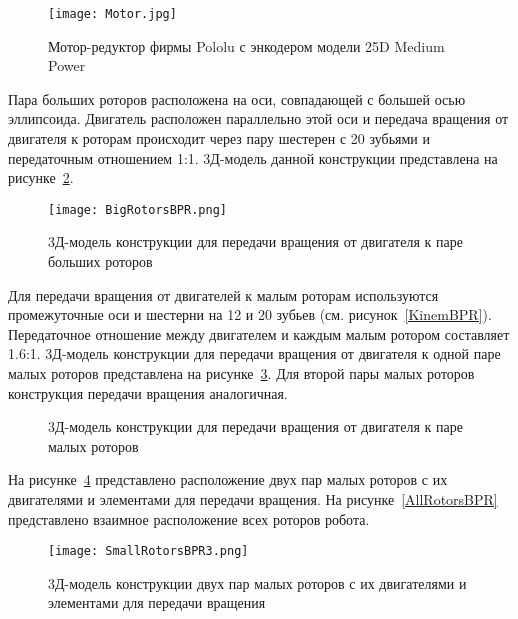 \begin{figure}[h]
	\centering
	\texttt{[image: Motor.jpg]}%
	\caption{Мотор-редуктор фирмы Pololu с энкодером модели 25D Medium Power}
	\label{MotorBPR}
\end{figure}





Пара больших роторов расположена на оси, совпадающей с большей осью эллипсоида. Двигатель расположен параллельно этой оси и передача вращения от двигателя к роторам происходит через пару шестерен с 20 зубьями и передаточным отношением 1:1. 3Д-модель данной конструкции представлена на рисунке~\ref{BigRotorsBPR}.

\begin{figure}[h]
	\centering
	\texttt{[image: BigRotorsBPR.png]}%
	\caption{3Д-модель конструкции для передачи вращения от двигателя к паре больших роторов}
	\label{BigRotorsBPR}
\end{figure}

Для передачи вращения от двигателей к малым роторам используются промежуточные оси и шестерни на 12 и 20 зубьев (см. рисунок~\ref{KinemBPR}). Передаточное отношение между двигателем и каждым малым ротором составляет 1.6:1. 3Д-модель конструкции для передачи вращения от двигателя к одной паре малых роторов представлена на рисунке~\ref{SmallRotorsBPR}. Для второй пары малых роторов конструкция передачи вращения аналогичная.

\begin{figure}[!ht]
	\begin{minipage}[h]{0.5\linewidth}
	\end{minipage}
	\hfill
	\begin{minipage}[h]{0.5\linewidth}
	\end{minipage}
	\caption{3Д-модель конструкции для передачи вращения от двигателя к паре малых роторов}
	\label{SmallRotorsBPR}
\end{figure}

На рисунке~\ref{SmallRotorsBPR3} представлено расположение двух пар малых роторов с их двигателями и элементами для передачи вращения. На рисунке~\ref{AllRotorsBPR} представлено взаимное расположение всех роторов робота.

\begin{figure}[h]
	\centering
	\texttt{[image: SmallRotorsBPR3.png]}%
	\caption{3Д-модель конструкции двух пар малых роторов с их двигателями и элементами для передачи вращения}
	\label{SmallRotorsBPR3}
\end{figure}

